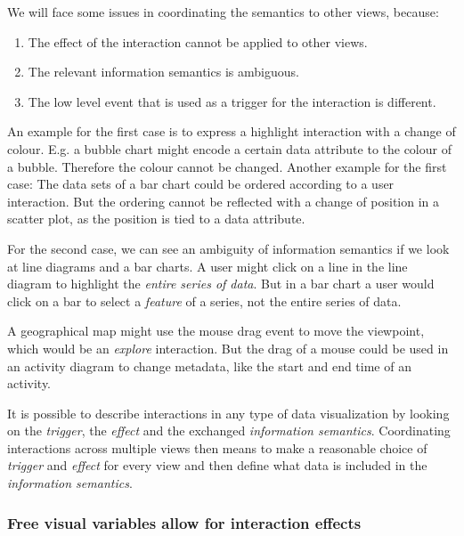 \documentclass{article}
\begin{document}
We will face some issues in coordinating the semantics to other views, because:
\begin{enumerate}
    \item
        The effect of the interaction cannot be applied to other views.
    \item
        The relevant information semantics is ambiguous.
    \item
        The low level event that is used as a trigger for the interaction is different.
\end{enumerate}
An example for the first case is to express a highlight interaction with a change of colour.
E.g. a bubble chart might encode a certain data attribute to the colour of a bubble.
Therefore the colour cannot be changed.
Another example for the first case:
The data sets of a bar chart could be ordered according to a user interaction.
But the ordering cannot be reflected with a change of position in a scatter plot, as the position is tied to a data attribute.

For the second case, we can see an ambiguity of information semantics if we look at line diagrams and a bar charts.
A user might click on a line in the line diagram to highlight the \emph{entire series of data}.
But in a bar chart a user would click on a bar to select a \emph{feature} of a series, not the entire series of data.

A geographical map might use the mouse drag event to move the viewpoint, which would be an \emph{explore} interaction.
But the drag of a mouse could be used in an activity diagram to change metadata, like the start and end time of an activity.

It is possible to describe interactions in any type of data visualization by looking on the \emph{trigger}, the \emph{effect} and the exchanged \emph{information semantics}.
Coordinating interactions across multiple views then means to make a reasonable choice of \emph{trigger} and \emph{effect} for every view and then define what data is included in the \emph{information semantics}.


\subsubsection{Free visual variables allow for interaction effects}
\end{document}
